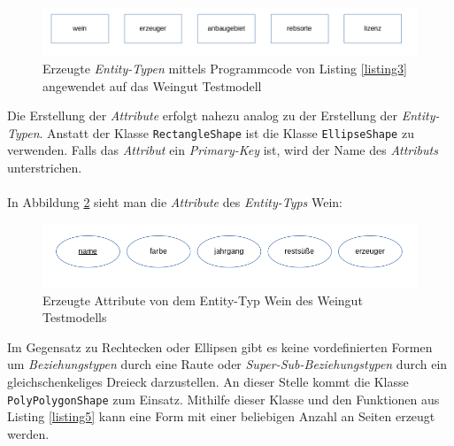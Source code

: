 \begin{figure}[h]
	\centering
	\includegraphics[width=14cm]{images/5.png}
	\caption{Erzeugte \textit{Entity-Typen} mittels Programmcode von Listing \ref{listing3} angewendet auf das Weingut Testmodell}
	\label{ergebnis3}
\end{figure}
\hon{}
\noindent
Die Erstellung der \textit{Attribute} erfolgt nahezu analog zu der Erstellung der \textit{Entity-Typen}. Anstatt der Klasse \verb|RectangleShape| ist die Klasse \verb|EllipseShape| zu verwenden. Falls das \textit{Attribut} ein \textit{Primary-Key} ist, wird der Name des \textit{Attributs} unterstrichen.
\noindent
\\
\\
\noindent
In Abbildung \ref{ergebnis4} sieht man die \textit{Attribute} des \textit{Entity-Typs} Wein: 


\begin{figure}[h]
	\centering
	\includegraphics[width=14cm]{images/7.png}
	\caption{Erzeugte Attribute von dem Entity-Typ Wein des Weingut Testmodells}
	\label{ergebnis4}
\end{figure}

\hon{}
\noindent
Im Gegensatz zu Rechtecken oder Ellipsen gibt es keine vordefinierten Formen um \textit{Beziehungstypen} durch eine Raute oder \textit{Super-Sub-Beziehungstypen} durch ein gleichschenkeliges Dreieck darzustellen. An dieser Stelle kommt die Klasse \verb|PolyPolygonShape| zum Einsatz. Mithilfe dieser Klasse und den Funktionen aus Listing \ref{listing5} kann eine Form mit einer beliebigen Anzahl an Seiten erzeugt werden.


